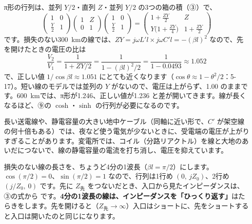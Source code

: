 \noindent π形の行列は、並列 $Y/2$・直列 $Z$・並列 $Y/2$ の3つの箱の積（③）で、
\[\begin{pmatrix}1&0\\\frac{Y}{2}&1\end{pmatrix}\begin{pmatrix}1&Z\\0&1\end{pmatrix}\begin{pmatrix}1&0\\\frac{Y}{2}&1\end{pmatrix}=\begin{pmatrix}1+\frac{ZY}{2}&Z\\Y\bigl(1+\frac{ZY}{4}\bigr)&1+\frac{ZY}{2}\end{pmatrix}\]
です。損失のない\qty{300}{km}の線では、$ZY=j\omega L'l\times j\omega C'l=-(\beta l)^2$ なので、先を開けたときの電圧の比は
\[\frac{V_2}{V_1}=\frac{1}{1+ZY/2}=\frac{1}{1-(\beta l)^2/2}=\frac{1}{1-0.0493}\approx1.052\]
で、正しい値 $1/\cos\beta l\approx1.051$ にとても近くなります（$\cos\theta\approx1-\theta^2/2$：5-17）。短い線のモデルでは並列の $Y$ がないので、電圧は上がらず、1.00 のままです。\qty{600}{km}では、π形が1.246、正しい値が1.236 と差が開いてきます。線が長くなるほど、⑨の $\cosh$・$\sinh$ の行列が必要になるのです。

\begin{phmijika}[夜の電圧の上がりすぎを防ぐ]
長い送電線や、静電容量の大きい地中ケーブル（同軸に近い形で、$C'$ が架空線の何十倍もある）では、夜など使う電気が少ないときに、受電端の電圧が上がりすぎることがあります。変電所では、コイル（分路リアクトル）を線と大地のあいだにつないで、線の静電容量の電流を打ち消し、電圧を抑えています。
\end{phmijika}

\label{ph:電-13:sec11}
損失のない線の長さを、ちょうど4分の1波長（$\beta l=\pi/2$）にします。$\cos(\pi/2)=0$、$\sin(\pi/2)=1$ なので、行列は1行め $(0,\ jZ_0)$、2行め $(j/Z_0,\ 0)$ です。先に $Z_{\text{先}}$ をつないだとき、入口から見たインピーダンスは、③の式から
\label{ph:電-13:lambda4}です。\textbf{4分の1波長の線は、インピーダンスを「ひっくり返す」}はたらきをします。先を開けると（$Z_{\text{先}}\to\infty$）入口はショートに、先をショートすると入口は開いたのと同じになります。

